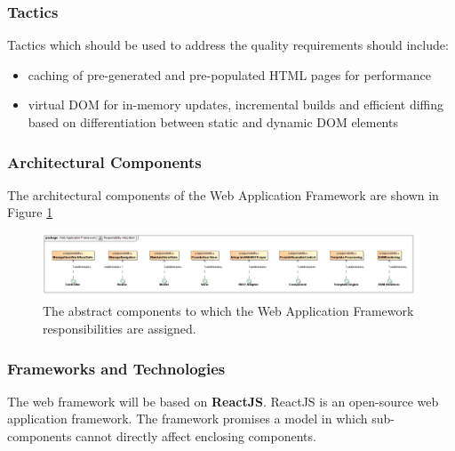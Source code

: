 \subsubsection{Tactics}
Tactics which should be used to address the quality requirements should include:
\begin{itemize}
	\item caching of pre-generated and pre-populated HTML pages for performance
	\item virtual DOM for in-memory updates, incremental builds and efficient 
	diffing based on differentiation between static and dynamic DOM elements
\end{itemize}
\subsubsection{Architectural Components}
The architectural components of the  Web Application Framework are shown in Figure \ref{fig:webApplicationFrameworkResponsibilityAllocation}
\begin{figure}[H]
	\begin{center}
	\includegraphics[scale=0.35]{../Diagrams and Charts/Web Application Framework/ResponsibilityAllocation.jpg}
	\caption{The abstract components to which the Web Application Framework responsibilities are assigned.}
	\label{fig:webApplicationFrameworkResponsibilityAllocation}
	\end{center}
\end{figure}

\subsubsection{Frameworks and Technologies}
The web framework will be based on \textbf{ReactJS}. ReactJS is an open-source web
application framework. The framework promises a model in which sub-components
cannot directly affect enclosing components.

